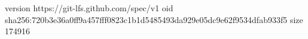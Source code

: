 version https://git-lfs.github.com/spec/v1
oid sha256:720b3e36a0ff9a457fff0823c1b1d5485493da929e05dc9e62f9534dfab933f5
size 174916
